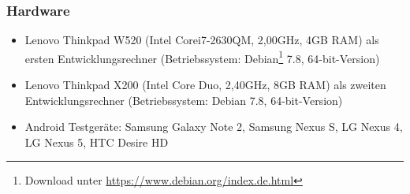 \subsubsection{Hardware}
\begin{itemize}
	\item Lenovo Thinkpad W520 (Intel\textsuperscript{\textregistered} Core\texttrademark   i7-2630QM, 2,00GHz, 4GB RAM) als ersten Entwicklungsrechner (Betriebssystem: Debian\footnote{ Download unter \url{https://www.debian.org/index.de.html}} 7.8, 64-bit-Version)
	\item Lenovo Thinkpad X200 (Intel\textsuperscript{\textregistered} Core Duo, 2,40GHz, 8GB RAM) als zweiten Entwicklungsrechner (Betriebssystem: Debian 7.8, 64-bit-Version)
	\item Android Testgeräte: Samsung Galaxy Note 2, Samsung Nexus S, LG Nexus 4, LG Nexus 5, HTC Desire HD
\end{itemize}
